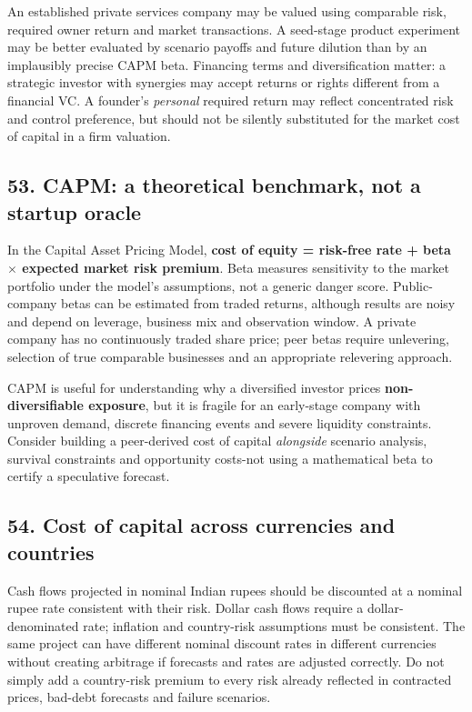 An established private services company may be valued using comparable risk, required owner return and market transactions. A seed-stage product experiment may be better evaluated by scenario payoffs and future dilution than by an implausibly precise CAPM beta. Financing terms and diversification matter: a strategic investor with synergies may accept returns or rights different from a financial VC. A founder's \textit{personal} required return may reflect concentrated risk and control preference, but should not be silently substituted for the market cost of capital in a firm valuation.

\subsection{53. CAPM: a theoretical benchmark, not a startup oracle}


In the Capital Asset Pricing Model, \textbf{cost of equity = risk-free rate + beta $\times$ expected market risk premium}. Beta measures sensitivity to the market portfolio under the model's assumptions, not a generic danger score. Public-company betas can be estimated from traded returns, although results are noisy and depend on leverage, business mix and observation window. A private company has no continuously traded share price; peer betas require unlevering, selection of true comparable businesses and an appropriate relevering approach.

CAPM is useful for understanding why a diversified investor prices \textbf{non-diversifiable exposure}, but it is fragile for an early-stage company with unproven demand, discrete financing events and severe liquidity constraints. Consider building a peer-derived cost of capital \textit{alongside} scenario analysis, survival constraints and opportunity costs-not using a mathematical beta to certify a speculative forecast.

\subsection{54. Cost of capital across currencies and countries}


Cash flows projected in nominal Indian rupees should be discounted at a nominal rupee rate consistent with their risk. Dollar cash flows require a dollar-denominated rate; inflation and country-risk assumptions must be consistent. The same project can have different nominal discount rates in different currencies without creating arbitrage if forecasts and rates are adjusted correctly. Do not simply add a country-risk premium to every risk already reflected in contracted prices, bad-debt forecasts and failure scenarios.

